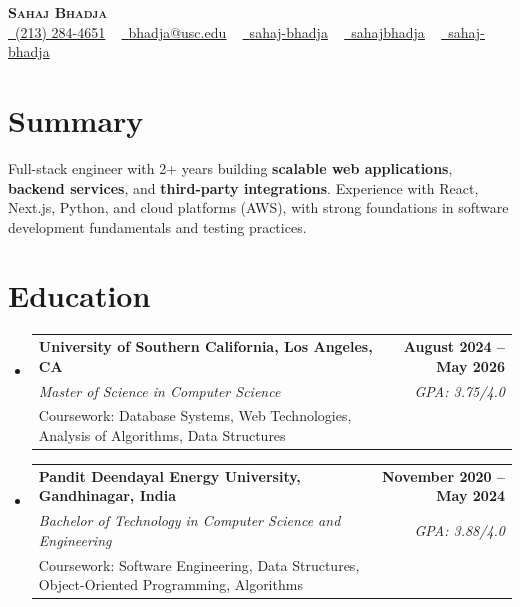 \documentclass[letterpaper,10pt]{article}
\makeatletter
\newcommand{\resumeEduSubheading}[5]{\vspace{-1pt}\item\begin{tabular*}{1.0\textwidth}[t]{l@{\extracolsep{\fill}}r}\textbf{#1} & \textbf{\small #2} \\\textit{\small #3} & \textit{\small #4} \\\small #5 & \\\end{tabular*}\vspace{-4pt}}
\newcommand{\resumeSubHeadingListStart}{\begin{itemize}[leftmargin=0.0in, label={}]}
\newcommand{\resumeSubHeadingListEnd}{\end{itemize}}
\makeatother
\begin{document}
\begin{center}
{\Huge \scshape \textbf{Sahaj Bhadja}} \\ \vspace{1pt}
\small \href{tel:(213) 284-4651}{\faPhone\ \underline{(213) 284-4651}} ~ \href{mailto:bhadja@usc.edu}{\raisebox{-0.2\height}\faEnvelope\ \underline{bhadja@usc.edu}} ~
\href{https://www.linkedin.com/in/sahaj-bhadja/}{\raisebox{-0.2\height}\faLinkedin\ \underline{sahaj-bhadja}} ~ \href{https://github.com/SAHAJ-BHADJA}{\raisebox{-0.2\height}\faGithub\ \underline{sahajbhadja}} ~
\href{https://sahaj-bhadja.vercel.app/}{\raisebox{-0.2\height}\faGlobe\ \underline{sahaj-bhadja}}
\end{center}
\vspace{-18pt}
\section{Summary}
\begin{itemize}[leftmargin=0.15in, label={}]
\small{\item{Full-stack engineer with 2+ years building \textbf{scalable web applications}, \textbf{backend services}, and \textbf{third-party integrations}. Experience with React, Next.js, Python, and cloud platforms (AWS), with strong foundations in software development fundamentals and testing practices.}}
\end{itemize}
\vspace{-16pt}
\section{Education}
\resumeSubHeadingListStart
\resumeEduSubheading{University of Southern California, Los Angeles, CA}{August 2024 -- May 2026}{Master of Science in Computer Science}{GPA: 3.75/4.0}{Coursework: Database Systems, Web Technologies, Analysis of Algorithms, Data Structures}
\vspace{-9pt}
\resumeEduSubheading{Pandit Deendayal Energy University, Gandhinagar, India}{November 2020 -- May 2024}{Bachelor of Technology in Computer Science and Engineering}{GPA: 3.88/4.0}{Coursework: Software Engineering, Data Structures, Object-Oriented Programming, Algorithms}
\resumeSubHeadingListEnd
\vspace{-14pt}
\end{document}
